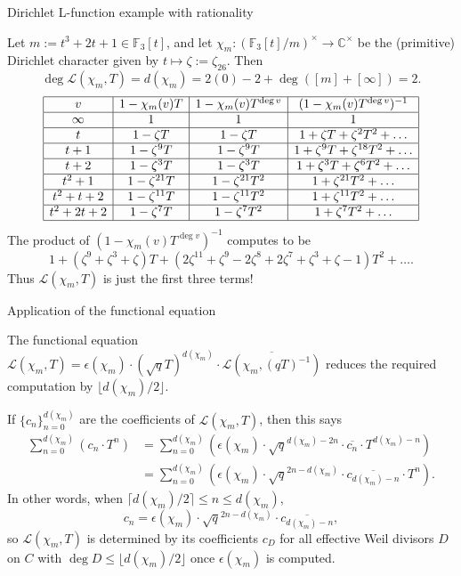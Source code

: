 \documentclass[10pt]{beamer}
\begin{document}
\begin{frame}[t]{Dirichlet L-function example with rationality}

Let $ m := t^3 + 2t + 1 \in \mathbb{F}_3[t] $, and let $ \chi_m : (\mathbb{F}_3[t] / m)^\times \to \mathbb{C}^\times $ be the (primitive) Dirichlet character given by $ t \mapsto \zeta := \zeta_{26} $. Then
$$ \deg\mathcal{L}(\chi_m, T) = d(\chi_m) = 2(0) - 2 + \deg([m] + [\infty]) = 2. $$
$$
\begin{array}{|c|c|c|c|}
\hline
v & 1 - \chi_m(v)T & 1 - \chi_m(v)T^{\deg v} & (1 - \chi_m(v)T^{\deg v})^{-1} \\
\hline
\infty & 1 & 1 & 1 \\
\hline
t & 1 - \zeta T & 1 - \zeta T & 1 + \zeta T + \zeta^2T^2 + \dots \\
\hline
t + 1 & 1 - \zeta^9T & 1 - \zeta^9T & 1 + \zeta^9T + \zeta^{18}T^2 + \dots \\
\hline
t + 2 & 1 - \zeta^3T & 1 - \zeta^3T & 1 + \zeta^3T + \zeta^6T^2 + \dots \\
\hline
t^2 + 1 & 1 - \zeta^{21}T & 1 - \zeta^{21}T^2 & 1 + \zeta^{21}T^2 + \dots \\
\hline
t^2 + t + 2 & 1 - \zeta^{11}T & 1 - \zeta^{11}T^2 & 1 + \zeta^{11}T^2 + \dots \\
\hline
t^2 + 2t + 2 & 1 - \zeta^7T & 1 - \zeta^7T^2 & 1 + \zeta^7T^2 + \dots \\
\hline
\end{array}
$$
The product of $ (1 - \chi_m(v)T^{\deg v})^{-1} $ computes to be
$$ 1 + (\zeta^9 + \zeta^3 + \zeta)T + (2\zeta^{11} + \zeta^9 - 2\zeta^8 + 2\zeta^7 + \zeta^3 + \zeta - 1)T^2 + \dots. $$
Thus $ \mathcal{L}(\chi_m, T) $ is just the first three terms!

\end{frame}

\begin{frame}[t]{Application of the functional equation}

The functional equation $ \mathcal{L}(\chi_m, T) = \epsilon(\chi_m) \cdot (\sqrt{q}T)^{d(\chi_m)} \cdot \overline{\mathcal{L}(\chi_m, (qT)^{-1})} $ reduces the required computation by $ \lfloor d(\chi_m) / 2\rfloor $.

\vspace{0.5cm} If $ \{c_n\}_{n = 0}^{d(\chi_m)} $ are the coefficients of $ \mathcal{L}(\chi_m, T) $, then this says
\begin{align*}
\sum_{n = 0}^{d(\chi_m)} (c_n \cdot T^n)
& = \sum_{n = 0}^{d(\chi_m)} (\epsilon(\chi_m) \cdot \sqrt{q}^{d(\chi_m) - 2n} \cdot \overline{c_n} \cdot T^{d(\chi_m) - n}) \\
& = \sum_{n = 0}^{d(\chi_m)} (\epsilon(\chi_m) \cdot \sqrt{q}^{2n - d(\chi_m)} \cdot \overline{c_{d(\chi_m) - n}} \cdot T^n).
\end{align*}
In other words, when $ \lceil d(\chi_m) / 2\rceil \le n \le d(\chi_m) $,
$$ c_n = \epsilon(\chi_m) \cdot \sqrt{q}^{2n - d(\chi_m)} \cdot \overline{c_{d(\chi_m) - n}}, $$
so $ \mathcal{L}(\chi_m, T) $ is determined by its coefficients $ c_D $ for all effective Weil divisors $ D $ on $ C $ with $ \deg D \le \lfloor d(\chi_m) / 2\rfloor $ once $ \epsilon(\chi_m) $ is computed.

\end{frame}
\end{document}
